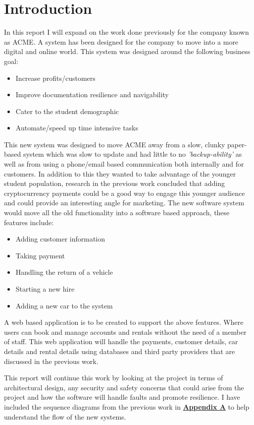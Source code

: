\section{Introduction}

  In this report I will expand on the work done previously for the company known as ACME. A system has been designed for the company to 
  move into a more digital and online world. This system was designed around the following business goal:
  \begin{itemize}
    \item Increase profits/customers
    \item Improve documentation resilience and navigability
    \item Cater to the student demographic
    \item Automate/speed up time intensive tasks
  \end{itemize}

  This new system was designed to move ACME away from a slow, clunky paper-based system which was slow to update and had little to no \textit{'backup-ability'}
  as well as from using a phone/email based communication both internally and for customers. In addition to this they wanted to take advantage of the younger  
  student population, research in the previous work concluded that adding cryptocurrency payments could be a good way to engage this younger audience and could 
  provide an interesting angle for marketing. The new software system would move all the old functionality into a software based approach,
  these features include:

  \begin{itemize}
    \item Adding customer information
    \item Taking payment
    \item Handling the return of a vehicle
    \item Starting a new hire
    \item Adding a new car to the system
  \end{itemize}

  A web based application is to be created to support the above features. Where users can book and manage accounts and rentals without the need of a member
  of staff. This web application will handle the payments, customer details, car details and rental details using databases and third party providers that 
  are discussed in the previous work.

  This report will continue this work by looking at the project in terms of architectural design, any security and safety concerns that could arise from the 
  project and how the software will handle faults and promote resilience. I have included the sequence diagrams from the previous work in 
  \hyperref[sec:AppendixA]{\textbf{Appendix A}} to help understand the flow of the new systems.

\newpage